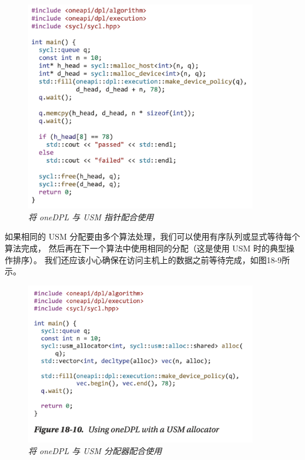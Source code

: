 \begin{figure}[H]
	\centering
	\includegraphics[width=0.9\textwidth]{figs/F18.9.png}
	\caption{\textit{将 oneDPL 与 USM 指针配合使用 }}
\end{figure}

如果相同的 USM 分配要由多个算法处理，我们可以使用有序队列或显式等待每个算法完成，
然后再在下一个算法中使用相同的分配（这是使用 USM 时的典型操作排序）。 
我们还应该小心确保在访问主机上的数据之前等待完成，如图18-9所示。

\begin{figure}[H]
	\centering
	\includegraphics[width=0.9\textwidth]{figs/F18.10.png}
	\caption{\textit{将 oneDPL 与 USM 分配器配合使用 }}
\end{figure}

